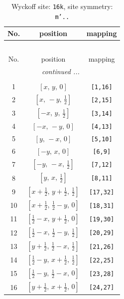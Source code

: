 \documentclass[fleqn,8pt]{jsarticle}
\begin{document}
\renewcommand{\arraystretch}{1.2}
\begin{longtable}{ccc}
\caption{Wyckoff site: {\tt 16k}, site symmetry: {\tt m'..}}
 \\
 \hline \hline
No. & position & mapping \\ \hline \endfirsthead

\multicolumn{2}{l}{\tablename\ \thetable{}} \\
 \hline \hline
No. & position & mapping \\ \hline \endhead

 \hline \hline
\multicolumn{2}{r}{\footnotesize\it continued ...} \\ \endfoot

 \hline \hline
\multicolumn{2}{r}{} \\ \endlastfoot

1 & $\left[ x,\, y,\, 0 \right]$ & {\tt [1,16]} \\ \hline
2 & $\left[ x,\, - y,\, \frac{1}{2} \right]$ & {\tt [2,15]} \\ \hline
3 & $\left[ - x,\, y,\, \frac{1}{2} \right]$ & {\tt [3,14]} \\ \hline
4 & $\left[ - x,\, - y,\, 0 \right]$ & {\tt [4,13]} \\ \hline
5 & $\left[ y,\, - x,\, 0 \right]$ & {\tt [5,10]} \\ \hline
6 & $\left[ - y,\, x,\, 0 \right]$ & {\tt [6,9]} \\ \hline
7 & $\left[ - y,\, - x,\, \frac{1}{2} \right]$ & {\tt [7,12]} \\ \hline
8 & $\left[ y,\, x,\, \frac{1}{2} \right]$ & {\tt [8,11]} \\ \hline
9 & $\left[ x + \frac{1}{2},\, y + \frac{1}{2},\, \frac{1}{2} \right]$ & {\tt [17,32]} \\ \hline
10 & $\left[ x + \frac{1}{2},\, \frac{1}{2} - y,\, 0 \right]$ & {\tt [18,31]} \\ \hline
11 & $\left[ \frac{1}{2} - x,\, y + \frac{1}{2},\, 0 \right]$ & {\tt [19,30]} \\ \hline
12 & $\left[ \frac{1}{2} - x,\, \frac{1}{2} - y,\, \frac{1}{2} \right]$ & {\tt [20,29]} \\ \hline
13 & $\left[ y + \frac{1}{2},\, \frac{1}{2} - x,\, \frac{1}{2} \right]$ & {\tt [21,26]} \\ \hline
14 & $\left[ \frac{1}{2} - y,\, x + \frac{1}{2},\, \frac{1}{2} \right]$ & {\tt [22,25]} \\ \hline
15 & $\left[ \frac{1}{2} - y,\, \frac{1}{2} - x,\, 0 \right]$ & {\tt [23,28]} \\ \hline
16 & $\left[ y + \frac{1}{2},\, x + \frac{1}{2},\, 0 \right]$ & {\tt [24,27]} \\
\end{longtable}
\end{document}
